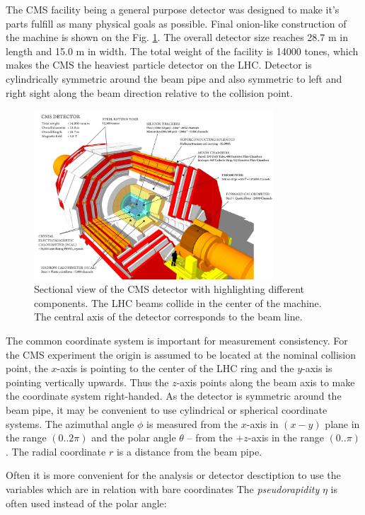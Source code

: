 The CMS facility being a general purpose detector was designed to make it's parts fulfill as many physical goals as possible.
Final onion-like construction of the machine is shown on the Fig. \ref{fig:CMSview}. The overall detector size reaches 28.7 m in length
and 15.0 m in width. The total weight of the facility is 14000 tones, which makes the CMS the heaviest particle detector on the
LHC. Detector is cylindrically symmetric around the beam pipe and also symmetric to left and right sight along the beam direction
relative to the collision point.

\begin{figure}[t]
  \centering
  \includegraphics[width=0.8\textwidth]{02_experimental_setup/plots/cms_120918_03.png}
  \caption{Sectional view of the CMS detector with highlighting different components. 
  The LHC beams collide in the center of the machine. The central axis of the detector 
  corresponds to the beam line.}
  \label{fig:CMSview}
\end{figure}

The common coordinate system is important for measurement consistency. For the CMS experiment the origin  
is assumed to be located at the nominal collision point, the $x$-axis is pointing to the center of the 
LHC ring and the $y$-axis is pointing vertically upwards. Thus the $z$-axis points along the beam axis to make
the coordinate system right-handed. As the detector is symmetric around the beam pipe, it may be convenient to use cylindrical or spherical
coordinate systems. The azimuthal angle $\phi$ is measured from the $x$-axis in $(x-y)$ plane in the range $(0..2\pi)$ 
and the polar angle $\theta$ -- from the $+z$-axis in the range $(0..\pi)$. The radial coordinate $r$ is a distance from the beam pipe. 

Often it is more convenient for the analysis or detector desctiption to use the variables which are in relation with bare coordinates
The \textit{pseudorapidity} $\eta$ is often used instead of the polar angle:

